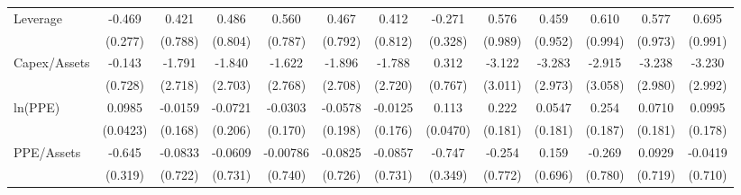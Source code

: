 {\begin{tabular}{l*{12}{c}}
Leverage            &      -0.469\sym{*}  &       0.421         &       0.486         &       0.560         &       0.467         &       0.412         &      -0.271         &       0.576         &       0.459         &       0.610         &       0.577         &       0.695         \\
                    &     (0.277)         &     (0.788)         &     (0.804)         &     (0.787)         &     (0.792)         &     (0.812)         &     (0.328)         &     (0.989)         &     (0.952)         &     (0.994)         &     (0.973)         &     (0.991)         \\
Capex/Assets        &      -0.143         &      -1.791         &      -1.840         &      -1.622         &      -1.896         &      -1.788         &       0.312         &      -3.122         &      -3.283         &      -2.915         &      -3.238         &      -3.230         \\
                    &     (0.728)         &     (2.718)         &     (2.703)         &     (2.768)         &     (2.708)         &     (2.720)         &     (0.767)         &     (3.011)         &     (2.973)         &     (3.058)         &     (2.980)         &     (2.992)         \\
ln(PPE)             &      0.0985\sym{**} &     -0.0159         &     -0.0721         &     -0.0303         &     -0.0578         &     -0.0125         &       0.113\sym{**} &       0.222         &      0.0547         &       0.254         &      0.0710         &      0.0995         \\
                    &    (0.0423)         &     (0.168)         &     (0.206)         &     (0.170)         &     (0.198)         &     (0.176)         &    (0.0470)         &     (0.181)         &     (0.181)         &     (0.187)         &     (0.181)         &     (0.178)         \\
PPE/Assets          &      -0.645\sym{**} &     -0.0833         &     -0.0609         &    -0.00786         &     -0.0825         &     -0.0857         &      -0.747\sym{**} &      -0.254         &       0.159         &      -0.269         &      0.0929         &     -0.0419         \\
                    &     (0.319)         &     (0.722)         &     (0.731)         &     (0.740)         &     (0.726)         &     (0.731)         &     (0.349)         &     (0.772)         &     (0.696)         &     (0.780)         &     (0.719)         &     (0.710)         \\

\end{tabular}}
